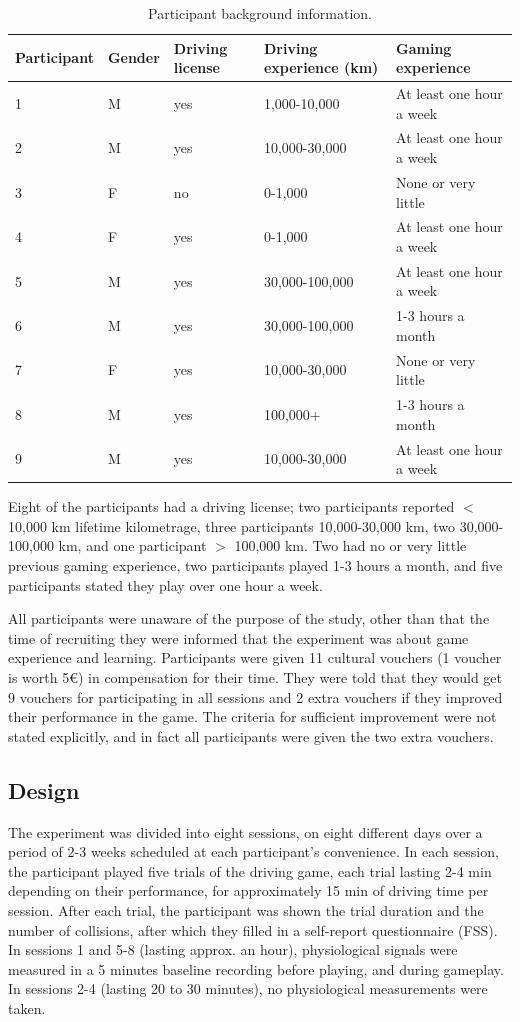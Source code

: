 \documentclass[fleqn,10pt]{wlscirep}
\begin{document}
\begin{table}[ht]
\centering
\caption{\label{tab:Participants}Participant background information.}
\begin{tabular}{lllll}
\hline
Participant & Gender & Driving license & Driving experience (km) & Gaming experience \\
\hline
1 & M & yes & 1,000-10,000 & At least one hour a week \\
2 & M & yes & 10,000-30,000 & At least one hour a week \\
3 & F & no & 0-1,000 & None or very little \\
4 & F & yes & 0-1,000 & At least one hour a week \\
5 & M & yes & 30,000-100,000 & At least one hour a week \\
6 & M & yes & 30,000-100,000 & 1-3 hours a month \\
7 & F & yes & 10,000-30,000 & None or very little \\
8 & M & yes & 100,000+ & 1-3 hours a month \\
9 & M & yes & 10,000-30,000 & At least one hour a week \\
\hline
\end{tabular}
\end{table}

Eight of the participants had a driving license; two participants reported $<$ 10,000 km lifetime kilometrage, three
participants 10,000-30,000 km, two 30,000-100,000 km, and one participant $>$ 100,000
km. Two had no or very little previous gaming experience, two participants played 1-3 hours a month, and five participants stated they play over one hour a week.

All participants were unaware of the purpose of the study, other than that the time of recruiting they were informed that the experiment was about game experience and learning. Participants were given 11 cultural vouchers (1 voucher is worth 5€) in compensation for their time. They were told that they would get 9 vouchers for participating in all sessions and 2 extra vouchers if they improved their performance in the game. The criteria for sufficient improvement were not stated explicitly, and in fact all participants were given the two extra vouchers.

\subsection*{Design}
The experiment was divided into eight sessions, on eight different days over a period of 2-3 weeks scheduled at each participant's convenience. In each session, the participant played five trials of the driving game, each trial lasting 2-4 min depending on their performance, for approximately 15 min of driving time per session. After each trial, the participant was shown the trial duration and the number of collisions, after which they filled in a self-report questionnaire (FSS). In sessions 1 and 5-8 (lasting approx. an hour), physiological signals were measured in a 5 minutes baseline recording before playing, and during gameplay. In sessions 2-4 (lasting 20 to 30 minutes), no physiological measurements were taken.
\end{document}

